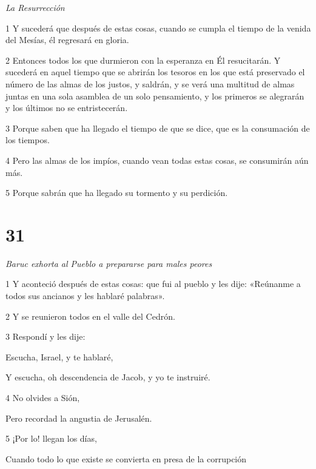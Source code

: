 \par \textit{La Resurrección}

\par 1 Y sucederá que después de estas cosas, cuando se cumpla el tiempo de la venida del Mesías, él regresará en gloria.

\par 2 Entonces todos los que durmieron con la esperanza en Él resucitarán. Y sucederá en aquel tiempo que se abrirán los tesoros en los que está preservado el número de las almas de los justos, y saldrán, y se verá una multitud de almas juntas en una sola asamblea de un solo pensamiento, y los primeros se alegrarán y los últimos no se entristecerán.

\par 3 Porque saben que ha llegado el tiempo de que se dice, que es la consumación de los tiempos.

\par 4 Pero las almas de los impíos, cuando vean todas estas cosas, se consumirán aún más.

\par 5 Porque sabrán que ha llegado su tormento y su perdición.

\chapter{31}

\par \textit{Baruc exhorta al Pueblo a prepararse para males peores}

\par 1 Y aconteció después de estas cosas: que fui al pueblo y les dije: «Reúnanme a todos sus ancianos y les hablaré palabras».

\par 2 Y se reunieron todos en el valle del Cedrón.

\par 3 Respondí y les dije:

Escucha, Israel, y te hablaré,

Y escucha, oh descendencia de Jacob, y yo te instruiré.

\par 4 No olvides a Sión,

Pero recordad la angustia de Jerusalén.

\par 5 ¡Por lo! llegan los días,

\par Cuando todo lo que existe se convierta en presa de la corrupción

